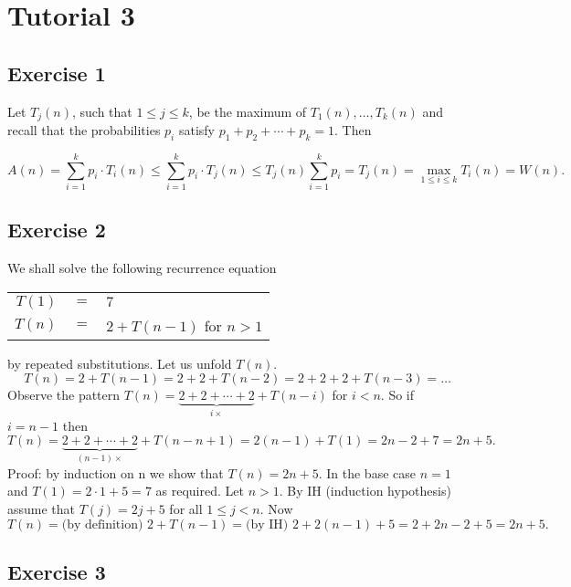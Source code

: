 \documentclass[english]{article}
\begin{document}

\pagestyle{fancy}
 \chead{}

\section*{Tutorial 3}

\subsection*{Exercise 1} 

Let $T_j(n)$, such that $1 \leq j \leq k$, be the maximum
of $T_1(n), \ldots, T_k(n)$ and recall that the probabilities
$p_i$ satisfy $p_1 + p_2 + \cdots + p_k = 1$. Then

$$A(n) = 
\sum_{i = 1}^k p_i\cdot T_i(n) \leq
\sum_{i = 1}^k p_i\cdot T_j(n) \leq
T_j(n) \sum_{i = 1}^k p_i = T_j(n) = \max_{1 \leq i \leq k} T_i(n) = W(n).$$ 

\subsection*{Exercise 2}

We shall solve the following recurrence equation
\begin{center}
\begin{tabular}{rcl}
$T(1)$ & $=$ & $7$ \\
$T(n)$ & $=$ & $2 + T(n-1)$ for $n>1$  
\end{tabular}
\end{center}
by repeated substitutions.
Let us unfold $T(n)$. 
$$T(n) = 2 + T(n-1) = 2 + 2 + T(n-2) = 2 + 2 + 2 + T(n-3) = \ldots $$
Observe the pattern 
$T(n) = \underbrace{2 + 2 + \cdots + 2}_{i \times} + T(n-i)$
for $i < n$. So if $i = n -1 $ then
$$T(n) = \underbrace{2 + 2 + \cdots + 2}_{(n-1) \times} + T(n-n+1)=
2(n-1) + T(1) = 2n - 2 + 7 = 2n +5.$$
Proof: by induction on n we show that $T(n)=2n + 5$. In the base case
$n=1$ and $T(1)=2\cdot 1 + 5 = 7$ as required. Let $n>1$.
By IH (induction hypothesis) assume that $T(j) = 2j +5$ for all
$1 \leq j < n$. Now $$T(n) = \mbox{(by definition) } 2 + T(n-1) =
\mbox{(by IH) }
2 + 2(n-1) + 5 = 2 + 2n - 2 + 5 = 2n + 5.$$

\subsection*{Exercise 3}
\end{document}

